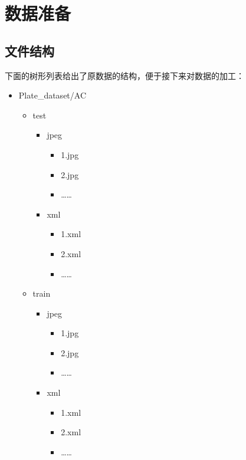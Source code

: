 \documentclass[UTF8]{article}
\title{\insertsubject}
\author{李沿橙 1900012766}
\date{\today}
\begin{document}
	\maketitle

	\section{数据准备}

	\subsection{文件结构}

	下面的树形列表给出了原数据的结构，便于接下来对数据的加工：
	
	\begin{multicols}{2}
	\begin{itemize}
		\item Plate\_dataset/AC
		\begin{itemize}
			\item test
			\begin{itemize}
				\item jpeg
				\begin{itemize}
					\item 1.jpg
					\item 2.jpg
					\item ……
				\end{itemize}
				\item xml
				\begin{itemize}
					\item 1.xml
					\item 2.xml
					\item ……
				\end{itemize}
			\end{itemize}
			\item train
			\begin{itemize}
				\item jpeg
				\begin{itemize}
					\item 1.jpg
					\item 2.jpg
					\item ……
				\end{itemize}
				\item xml
				\begin{itemize}
					\item 1.xml
					\item 2.xml
					\item ……
				\end{itemize}

\end{itemize}
\end{itemize}
\end{itemize}
\end{multicols}
\end{document}
